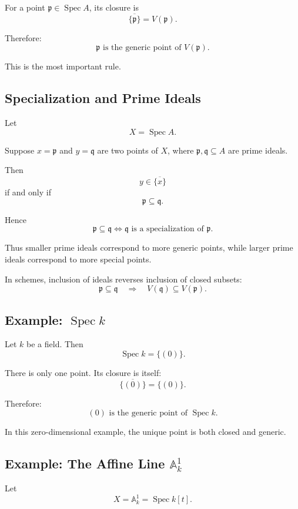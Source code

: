 \documentclass[12pt,a4paper]{article}
\theoremstyle{notespace}
\begin{document}
For a point \(\mathfrak p\in \operatorname{Spec} A\), its closure is
\[
\boxed{
	\overline{\{\mathfrak p\}}=V(\mathfrak p).
}
\]

Therefore:
\[
\boxed{
	\mathfrak p \text{ is the generic point of }V(\mathfrak p).
}
\]

This is the most important rule.

\subsection{Specialization and Prime Ideals}

Let
\[
X=\operatorname{Spec} A.
\]

Suppose \(x=\mathfrak p\) and \(y=\mathfrak q\) are two points of \(X\), where \(\mathfrak p,\mathfrak q\subseteq A\) are prime ideals.

Then
\[
y\in \overline{\{x\}}
\]
if and only if
\[
\mathfrak p\subseteq \mathfrak q.
\]

Hence
\[
\boxed{
	\mathfrak p\subseteq \mathfrak q
	\iff
	\mathfrak q \text{ is a specialization of } \mathfrak p.
}
\]

Thus smaller prime ideals correspond to more generic points, while larger prime ideals correspond to more special points.

In schemes, inclusion of ideals reverses inclusion of closed subsets:
\[
\mathfrak p\subseteq \mathfrak q
\quad\Longrightarrow\quad
V(\mathfrak q)\subseteq V(\mathfrak p).
\]

\subsection{Example: \(\operatorname{Spec} k\)}

Let \(k\) be a field. Then
\[
\operatorname{Spec} k=\{(0)\}.
\]

There is only one point. Its closure is itself:
\[
\overline{\{(0)\}}=\{(0)\}.
\]

Therefore:
\[
\boxed{
	(0)\text{ is the generic point of }\operatorname{Spec} k.
}
\]

In this zero-dimensional example, the unique point is both closed and generic.

\subsection{Example: The Affine Line \(\mathbb A^1_k\)}

Let
\[
X=\mathbb A^1_k=\operatorname{Spec} k[t].
\]
\end{document}
